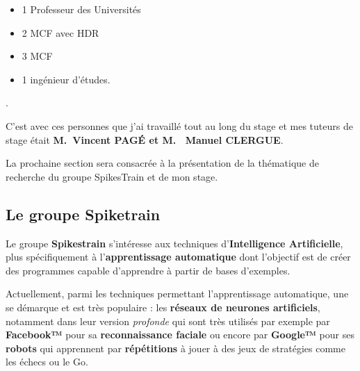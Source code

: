 \begin{itemize}
\tightlist
\item
  1 Professeur des Universités
\item
  2 MCF avec HDR
\item
  3 MCF
\item
  1 ingénieur d'études.
\end{itemize}.

C'est avec ces personnes que j'ai travaillé tout au long du stage et mes
tuteurs de stage était \textbf{M.~Vincent PAGÉ et M. ~Manuel CLERGUE}.

%

La prochaine section sera consacrée à la présentation de la thématique
de recherche du groupe SpikesTrain et de mon stage.


\hypertarget{Objectif_Spike}{%
\subsection{Le groupe Spiketrain}\label{Groupe_Spiketrain}}

Le groupe \textbf{Spikestrain} s'intéresse aux techniques
d'\textbf{Intelligence Artificielle}, plus spécifiquement à
l'\textbf{apprentissage automatique} dont l'objectif est de créer des
programmes capable d'apprendre à partir de bases d'exemples.

Actuellement, parmi les techniques permettant l'apprentissage
automatique, une se démarque et est très populaire : les
\textbf{réseaux de neurones artificiels}, notamment dans leur version
\emph{profonde} qui sont très utilisés par exemple par \textbf{Facebook™}
pour sa \textbf{reconnaissance faciale} ou encore par \textbf{Google™}
pour ses \textbf{robots} qui apprennent par \textbf{répétitions} à jouer
à des jeux de stratégies comme les échecs ou le Go.


